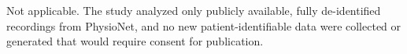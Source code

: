 Not applicable. The study analyzed only publicly available, fully de-identified recordings from PhysioNet, and no new patient-identifiable data were collected or generated that would require consent for publication.
